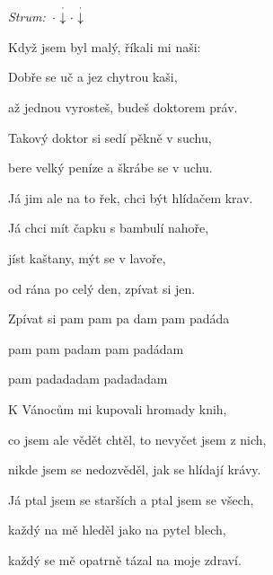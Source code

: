 \begin{song}


\begin{headerbox}
\textit{Strum:} $\Miss\StaccatoDown\Miss\StaccatoDown$
\end{headerbox}

\begin{hchordbox}
\end{hchordbox}

\Large

Když jsem byl malý, říkali mi naši: \par
{}Dobře se uč a jez chytrou kaši, \par
{}až jednou vyrosteš, budeš doktorem práv. \par

\bigskip

Takový doktor si sedí pěkně v suchu, \par
{}bere velký peníze a škrábe se v uchu. \par
{}Já jim ale na to řek, chci být hlídačem krav. \par

\bigskip

\begin{chorusbox}{\Refren}
Já chci mít čapku s bambulí nahoře,  \par
{}jíst kaštany, mýt se v lavoře, \par
{}od rána po celý den, zpívat si jen. \par
Zpívat si pam pam pa dam pam padáda \par
{}pam pam padam pam padádam \par
{}pam padadadam padadadam \par
\end{chorusbox}

\bigskip

K Vánocům mi kupovali hromady knih, \par
{}co jsem ale vědět chtěl, to nevyčet jsem z nich, \par
{}nikde jsem se nedozvěděl, jak se hlídají krávy. \par

\bigskip

Já ptal jsem se starších a ptal jsem se všech, \par
{}každý na mě hleděl jako na pytel blech, \par
{}každý se mě opatrně tázal na moje zdraví. \par


\end{song}
